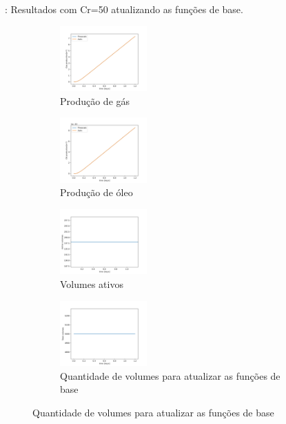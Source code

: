 \documentclass[professionalfont]{beamer}
\begin{document}
\begin{frame}{\FrameProblemName: {\small Resultados com Cr=50 atualizando as funções de base.}}
    \begin{figure}[!ht]
        \centering
        \begin{subfigure}{.48\textwidth}
            \centering
            \includegraphics[height=2.5cm]{./imgs/pr2/3k_5000x1x1/cr 50/v2/update/svgtopng/figura_case-finescale_3k_5000_CR50_updateGas_production.png}
            \caption{Produção de gás}
        \end{subfigure}
        \hfill
        \begin{subfigure}{.48\textwidth}
            \centering
            \includegraphics[height=2.5cm]{./imgs/pr2/3k_5000x1x1/cr 50/v2/update/svgtopng/figura_case-finescale_3k_5000_CR50_updateOil_production.png}
            \caption{Produção de óleo}
        \end{subfigure}
        \bigskip
        \begin{subfigure}{.48\textwidth}
            \centering
            \includegraphics[height=2.5cm]{./imgs/pr2/3k_5000x1x1/cr 50/v2/update/svgtopng/figura_case-finescale_3k_5000_CR50_updateActive_volumes.png}
            \caption{Volumes ativos}
        \end{subfigure}
        \hfill
        \begin{subfigure}{.48\textwidth}
            \centering
            \includegraphics[height=2.5cm]{./imgs/pr2/3k_5000x1x1/cr 50/v2/update/svgtopng/figura_case-finescale_3k_5000_CR50_updateTotal volumes.png}
            \caption{Quantidade de volumes para atualizar as funções de base}
        \end{subfigure}
        \label{fig:fig5_pr2-cr50}
        
    \end{figure}
\end{frame}
\end{document}
